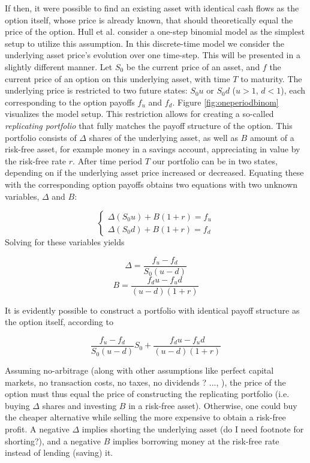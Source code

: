 \documentclass[english,12pt,a4paper,pdftex,sci,utf8]{aaltothesis}
\begin{document}
If then, it were possible to find an existing asset with identical cash flows as the option itself, whose price is already known, that should theoretically equal the price of the option. Hull et al. \cite{hull2013fundamentals} consider a one-step binomial model as the simplest setup to utilize this assumption. In this discrete-time model we consider the underlying asset price's evolution over one time-step. This will be presented in a slightly different manner. Let $S_0$ be the current price of an asset, and $f$ the current price of an option on this underlying asset, with time $T$ to maturity. The underlying price is restricted to two future states: $S_0u$ or $S_0d$ ($u>1$, $d<1$), each corresponding to the option payoffs $f_u$ and $f_d$. Figure \ref{fig:oneperiodbinom} visualizes the model setup. This restriction allows for creating a so-called \emph{replicating portfolio} that fully matches the payoff structure of the option. This portfolio consists of $\Delta$ shares of the underlying asset, as well as $B$ amount of a risk-free asset, for example money in a savings account, appreciating in value by the risk-free rate $r$. After time period $T$ our portfolio can be in two states, depending on if the underlying asset price increased or decreased. Equating these with the corresponding option payoffs obtains two equations with two unknown variables, $\Delta$ and $B$:

\begin{equation}
\begin{cases}
    \Delta (S_0u) + B(1+r) = f_u\\
    \Delta (S_0d) + B(1+r) = f_d
\end{cases}
\end{equation}
Solving for these variables yields

\begin{equation}
    \Delta = \frac{f_u - f_d}{S_0(u-d)}
\end{equation}
\begin{equation}
    B = \frac{f_du-f_ud}{(u-d)(1+r)}
\end{equation}

It is evidently possible to construct a portfolio with identical payoff structure as the option itself, according to


\begin{equation}
     \frac{f_u - f_d}{S_0(u-d)} S_0 + \frac{f_du-f_ud}{(u-d)(1+r)}
\label{eq:replicating-portfolio}
\end{equation}


Assuming no-arbitrage (along with other assumptions like perfect capital markets, no transaction costs, no taxes, no dividends ? ..., ), the price of the option must thus equal the price of constructing the replicating portfolio (i.e. buying $\Delta$ shares and investing $B$ in a risk-free asset). Otherwise, one could buy the cheaper alternative while selling the more expensive to obtain a risk-free profit. A negative $\Delta$ implies shorting the underlying asset (do I need footnote for shorting?), and a negative $B$ implies borrowing money at the risk-free rate instead of lending (saving) it.
\end{document}
